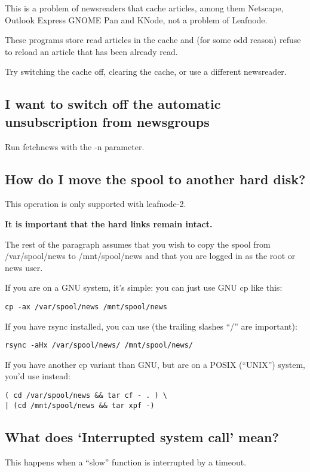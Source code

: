 \documentclass[10pt,english,a5paper]{article}
\begin{document}
   This is a problem of newsreaders that cache articles, among them
   Netscape, Outlook Express GNOME Pan and KNode, not a problem of Leafnode.

   These programs store read articles in the cache and (for some odd
   reason) refuse to reload an article that has been already read.

   Try switching the cache off, clearing the cache, or use a different
   newsreader.

\subsection{I want to switch off the automatic unsubscription from
newsgroups}

   Run fetchnews with the -n parameter.

\subsection{How do I move the spool to another hard disk?}

This operation is only supported with leafnode-2.

\textbf{It is important that the hard links remain intact.}

The rest of the paragraph assumes that you wish to copy the spool from
/var/spool/news to /mnt/spool/news and that you are logged in as the
root or news user.

If you are on a GNU system, it's simple: you can just use GNU cp like this:
\begin{verbatim}
cp -ax /var/spool/news /mnt/spool/news
\end{verbatim}

If you have rsync installed, you can use (the trailing slashes ``/'' are
important):
\begin{verbatim}
rsync -aHx /var/spool/news/ /mnt/spool/news/
\end{verbatim}

If you have another cp variant than GNU, but are on a POSIX (``UNIX'')
system, you'd use instead:
\begin{verbatim}
( cd /var/spool/news && tar cf - . ) \
| (cd /mnt/spool/news && tar xpf -)
\end{verbatim}

\subsection{What does `Interrupted system call' mean?}

This happens when a ``slow'' function is interrupted by a timeout.

   
\end{document}
